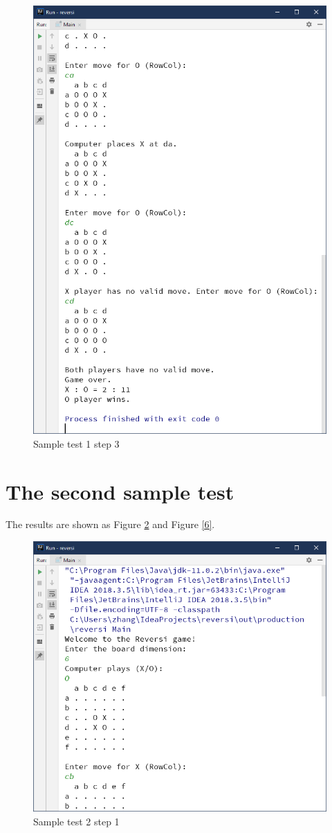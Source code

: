 \documentclass[a4paper]{report}
\begin{document}
\begin{figure}
  \centering
  \includegraphics[width=12cm]{Capture3.png}
  \caption{Sample test 1 step 3}\label{4}
\end{figure}

\section{The second sample test}
The results are shown as Figure \ref{5} and Figure \ref{6}. 

\begin{figure}
  \centering
  \includegraphics[width=12cm]{Capture4.png}
  \caption{Sample test 2 step 1}\label{5}
\end{figure}
\end{document}
